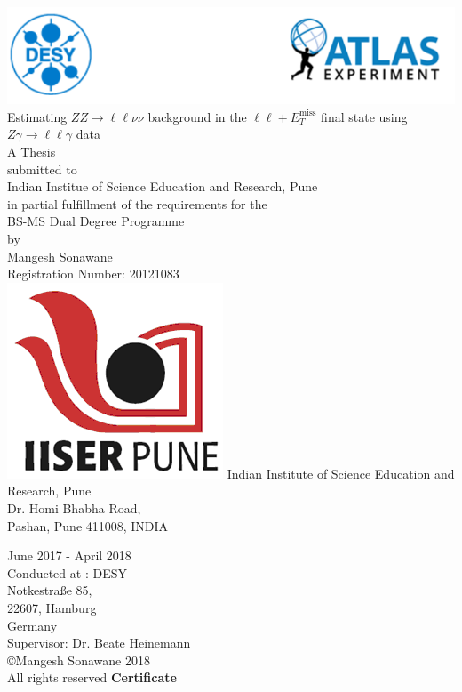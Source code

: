 \documentclass[12pt,a4paper,openright,twoside]{report}
\newcommand{\ZZ}{$ZZ\to \ell\ell\nu\nu$ }
\newcommand{\Zg}{$Z\gamma\to \ell\ell\gamma$ }
\newcommand{\llM}{$\ell\ell+E_T^{\mathrm{miss}}$ }
\begin{document}
\begin{titlepage}
\pagestyle{plain}
\centering
\includegraphics[width=0.9\linewidth]{Title_Head.png}
\vfill
{\Huge Estimating \ZZ background in the \llM final state using \Zg data\\\vspace{1cm}\Large A Thesis \\}
\vspace{1cm}
{\Large submitted to\\Indian Institue of Science Education and Research, Pune\\ in partial fulfillment of the requirements for the \\BS-MS Dual Degree Programme\vspace{1cm}\\by\vspace{1cm}\\Mangesh Sonawane\vspace{0.2cm}\\Registration Number: 20121083\\}
\vspace{1cm}
\includegraphics[scale=0.8]{iiser_logo.png}
\vfill
{\Large Indian Institute of Science Education and Research, Pune\vspace{0.1cm}\\Dr. Homi Bhabha Road,\vspace{0.3cm}\\ Pashan, Pune 411008, INDIA}
\vfill
\vfill
\end{titlepage}
\pagestyle{empty}
\begin{center}
{\large June 2017 - April 2018\\}
\vspace{10cm}
\large 
Conducted at : DESY\\
Notkestra{\ss}e 85,\\
22607, Hamburg\\
Germany\\
\vspace{10cm}
Supervisor: Dr. Beate Heinemann\\
\copyright Mangesh Sonawane 2018\\
All rights reserved
\vfill
\newpage
\Huge \textbf{Certificate\\}
\end{center}
\end{document}
